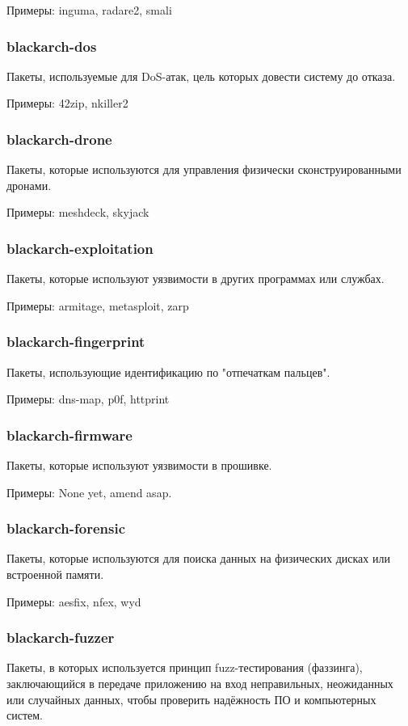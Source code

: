 \documentclass[a4paper, oneside, 11pt]{book}
\begin{document}
Примеры: inguma, radare2, smali

\subsubsection{blackarch-dos}
Пакеты, используемые для DoS-атак, цель которых довести систему до отказа.

Примеры: 42zip, nkiller2

\subsubsection{blackarch-drone}
Пакеты, которые используются для управления физически сконструированными дронами.

Примеры: meshdeck, skyjack

\subsubsection{blackarch-exploitation}
Пакеты, которые используют уязвимости в других программах или службах.

Примеры: armitage, metasploit, zarp

\subsubsection{blackarch-fingerprint}
Пакеты, использующие идентификацию по "отпечаткам пальцев".

Примеры: dns-map, p0f, httprint

\subsubsection{blackarch-firmware}
Пакеты, которые используют уязвимости в прошивке.

Примеры: None yet, amend asap.

\subsubsection{blackarch-forensic}
Пакеты, которые используются для поиска данных на физических дисках 
или встроенной памяти.

Примеры: aesfix, nfex, wyd

\subsubsection{blackarch-fuzzer}
Пакеты, в которых используется принцип fuzz-тестирования (фаззинга),
заключающийся в передаче приложению на вход неправильных, неожиданных 
или случайных данных, чтобы проверить надёжность ПО и компьютерных систем.
\end{document}
